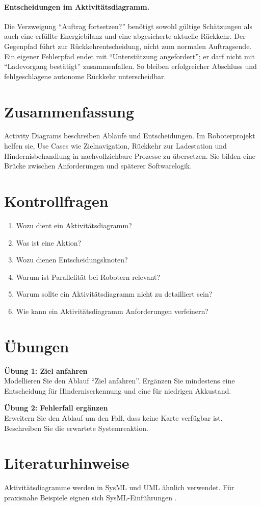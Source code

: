 \paragraph{Entscheidungen im Aktivitätsdiagramm.}
Die Verzweigung \enquote{Auftrag fortsetzen?} benötigt sowohl gültige Schätzungen als auch eine erfüllte Energiebilanz und eine abgesicherte aktuelle Rückkehr. Der Gegenpfad führt zur Rückkehrentscheidung, nicht zum normalen Auftragsende. Ein eigener Fehlerpfad endet mit \enquote{Unterstützung angefordert}; er darf nicht mit \enquote{Ladevorgang bestätigt} zusammenfallen. So bleiben erfolgreicher Abschluss und fehlgeschlagene autonome Rückkehr unterscheidbar.

\section{Zusammenfassung}
Activity Diagrams beschreiben Abläufe und Entscheidungen. Im Roboterprojekt helfen sie, Use Cases wie Zielnavigation, Rückkehr zur Ladestation und Hindernisbehandlung in nachvollziehbare Prozesse zu übersetzen. Sie bilden eine Brücke zwischen Anforderungen und späterer Softwarelogik.

\section{Kontrollfragen}
\begin{enumerate}
    \item Wozu dient ein Aktivitätsdiagramm?
    \item Was ist eine Aktion?
    \item Wozu dienen Entscheidungsknoten?
    \item Warum ist Parallelität bei Robotern relevant?
    \item Warum sollte ein Aktivitätsdiagramm nicht zu detailliert sein?
    \item Wie kann ein Aktivitätsdiagramm Anforderungen verfeinern?
\end{enumerate}

\section{Übungen}
\begin{uebungbox}
\textbf{Übung 1: Ziel anfahren}\\
Modellieren Sie den Ablauf \enquote{Ziel anfahren}. Ergänzen Sie mindestens eine Entscheidung für Hinderniserkennung und eine für niedrigen Akkustand.
\end{uebungbox}

\begin{uebungbox}
\textbf{Übung 2: Fehlerfall ergänzen}\\
Erweitern Sie den Ablauf um den Fall, dass keine Karte verfügbar ist. Beschreiben Sie die erwartete Systemreaktion.
\end{uebungbox}

\section{Literaturhinweise}
Aktivitätsdiagramme werden in SysML und UML ähnlich verwendet. Für praxisnahe Beispiele eignen sich SysML-Einführungen \cite{delligatti2014,friedenthal2014}.
